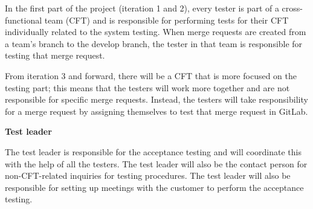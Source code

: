 \noindent In the first part of the project (iteration 1 and 2), every tester is part of a cross-functional team (CFT) and is responsible for performing tests for their CFT individually related to the system testing. When merge requests are created from a team's branch to the develop branch, the tester in that team is responsible for testing that merge request.
\newline


\noindent From iteration 3 and forward, there will be a CFT that is more focused on the testing part; this means that the testers will work more together and are not responsible for specific merge requests. Instead, the testers will take responsibility for a merge request by assigning themselves to test that merge request in GitLab.
\newline

\noindent \textbf{Test leader}\newline

\noindent The test leader is responsible for the acceptance testing and will coordinate this with the help of all the testers. The test leader will also be the contact person for non-CFT-related inquiries for testing procedures. The test leader will also be responsible for setting up meetings with the customer to perform the acceptance testing.